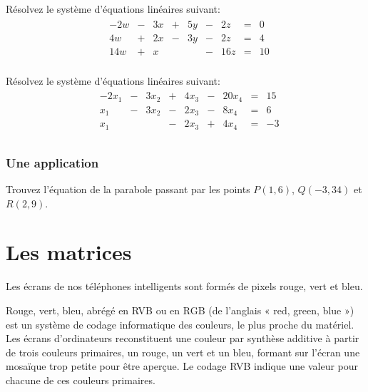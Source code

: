 \documentclass[]{book}
\theoremstyle{definition}
\theoremstyle{definition}
\theoremstyle{definition}
\theoremstyle{remark}
\let\BeginKnitrBlock\begin \let\EndKnitrBlock\end
\begin{document}
\BeginKnitrBlock{example}
\protect\hypertarget{exm:unnamed-chunk-36}{}{\label{exm:unnamed-chunk-36} }Résolvez le système d'équations linéaires suivant:
\begin{align*}
\begin{array}{cccccccccc}
&-2w&-&3x&+&5y&-&2z&=&0\\
&4w&+&2x&-&3y&-&2z&=&4\\
&14w&+&x&&&-&16z&=&10\\
\end{array}
\end{align*}
\EndKnitrBlock{example}

\BeginKnitrBlock{example}
\protect\hypertarget{exm:unnamed-chunk-37}{}{\label{exm:unnamed-chunk-37} }Résolvez le système d'équations linéaires suivant:
\begin{align*}
\begin{array}{cccccccccc}
&-2x_{1}&-&3x_{2}&+&4x_{3}&-&20x_{4}&=&15\\
&x_{1}&-&3x_{2}&-&2x_{3}&-&8x_{4}&=&6\\
&x_{1}&&&-&2x_{3}&+&4x_{4}&=&-3\\
\end{array}
\end{align*}
\EndKnitrBlock{example}

\hypertarget{une-application-1}{%
\subsection{Une application}\label{une-application-1}}

\BeginKnitrBlock{example}
\protect\hypertarget{exm:unnamed-chunk-38}{}{\label{exm:unnamed-chunk-38} }Trouvez l'équation de la parabole passant par les points \(P(1,6)\), \(Q(-3,34)\) et \(R(2,9)\).
\EndKnitrBlock{example}

\hypertarget{matrices}{%
\chapter{Les matrices}\label{matrices}}

\BeginKnitrBlock{example}[Les photos numériques]
\protect\hypertarget{exm:unnamed-chunk-39}{}{\label{exm:unnamed-chunk-39} {} }Les écrans de nos téléphones intelligents sont formés de pixels rouge, vert et bleu.

Rouge, vert, bleu, abrégé en RVB ou en RGB (de l'anglais « red, green, blue ») est un système de codage informatique des couleurs, le plus proche du matériel. Les écrans d'ordinateurs reconstituent une couleur par synthèse additive à partir de trois couleurs primaires, un rouge, un vert et un bleu, formant sur l'écran une mosaïque trop petite pour être aperçue. Le codage RVB indique une valeur pour chacune de ces couleurs primaires.
\EndKnitrBlock{example}
\end{document}
